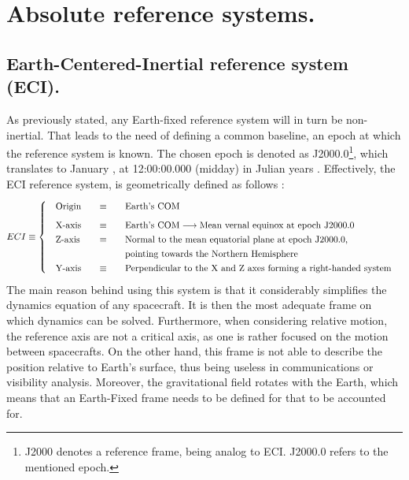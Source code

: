 \section{Absolute reference systems.}
%
	\subsection{Earth-Centered-Inertial reference system (ECI).}
	\indent As previously stated, any Earth-fixed reference system will in turn be non-inertial. That leads to the need of defining a common baseline, \ie an epoch at which the reference system is known. The chosen epoch is denoted as J2000.0\footnote{J2000 denotes a reference frame, being analog to ECI. J2000.0 refers to the mentioned epoch.}, which translates to January , at 12:00:00.000 (midday) in Julian years \cite[see][, glossary]{Time_handbook}. Effectively, the ECI reference system, is geometrically defined as follows \cite{Tapley}:
	\[
	\arraycolsep=10pt
	\def\arraystretch{1.3}
	ECI \equiv\left\{
	\begin{array}{lll}
	\text{Origin} 	& \equiv 	& \text{Earth's COM} \\[0.5 em]
	\text{X-axis} 	& \equiv 	& \text{Earth's COM} \longrightarrow \text{Mean vernal equinox at epoch J2000.0} \\
	\text{Z-axis} 	& \equiv 	& \text{Normal to the mean equatorial plane at epoch J2000.0, } \\
	  				& 			& \text{pointing towards the Northern Hemisphere} \\
	\text{Y-axis} 	& \equiv 	& \text{Perpendicular to the X and Z axes forming a right-handed system} \\
	\end{array}
	\right.
	\]
	\indent The main reason behind using this system is that it considerably simplifies the dynamics equation of any spacecraft. It is then the most adequate frame on which dynamics can be solved. Furthermore, when considering relative motion, the reference axis are not a critical axis, as one is rather focused on the motion between spacecrafts. On the other hand, this frame is not able to describe the position relative to Earth's surface, thus being useless in communications or visibility analysis. Moreover, the gravitational field rotates with the Earth, which means that an Earth-Fixed frame needs to be defined for that to be accounted for.
